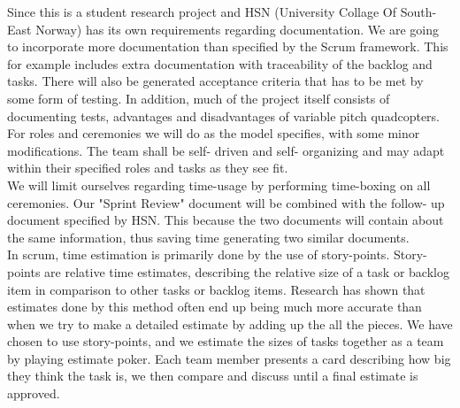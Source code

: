 Since this is a student research project and HSN (University Collage Of South-East Norway) has its own requirements regarding documentation. We are going to incorporate more documentation than specified by the Scrum framework. This for example includes extra documentation with traceability of the backlog and tasks. There will also be generated acceptance criteria that has to be met by some form of testing. In addition, much of the project itself consists of documenting tests, advantages and disadvantages of variable pitch quadcopters. \\

For roles and ceremonies we will do as the model specifies, with some minor modifications. The team shall be self- driven and self- organizing and may adapt within their specified roles and tasks as they see fit. \\

We will limit ourselves regarding time-usage by performing time-boxing on all ceremonies. Our "Sprint Review" document will be combined with the follow- up document specified by HSN. This because the two documents will contain about the same information, thus saving time generating two similar documents.\\

In scrum, time estimation is primarily done by the use of story-points. Story-points are relative time estimates, describing the relative size of a task or backlog item in comparison to other tasks or backlog items. Research has shown that estimates done by this method often end up being much more accurate than when we try to make a detailed estimate by adding up the all the pieces. We have chosen to use story-points, and we estimate the sizes of tasks  together as a team by playing estimate poker. Each team member presents a card describing how big they think the task is, we then compare and discuss until a final estimate is approved. 


